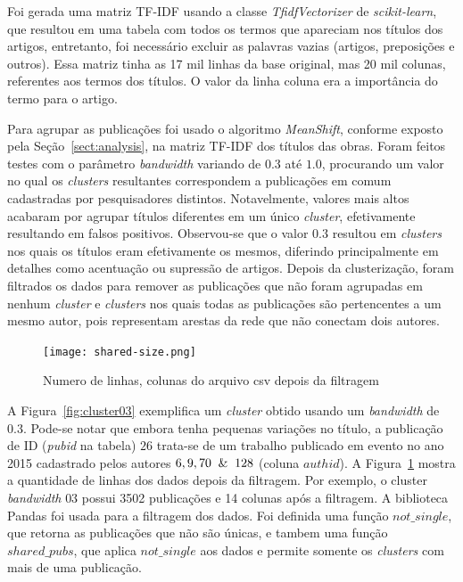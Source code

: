 \documentclass[12pt]{article}
\begin{document}
Foi gerada uma matriz TF-IDF usando a classe \textit{TfidfVectorizer} de \textit{scikit-learn}, que resultou em uma tabela com todos os termos que apareciam nos títulos dos artigos, entretanto, foi necessário excluir as palavras vazias (artigos, preposições e outros). Essa matriz tinha as 17 mil linhas da base original, mas 20 mil colunas, referentes aos termos dos títulos. O valor da linha coluna era a importância do termo para o artigo.

Para agrupar as publicações foi usado o algoritmo \textit{MeanShift}, conforme exposto pela Seção~\ref{sect:analysis}, na matriz TF-IDF dos títulos das obras. Foram feitos testes com o parâmetro \textit{bandwidth} variando de $0.3$ até $1.0$, procurando um valor no qual os \textit{clusters} resultantes correspondem a publicações em comum cadastradas por pesquisadores distintos. Notavelmente, valores mais altos acabaram por agrupar títulos diferentes em um único \textit{cluster}, efetivamente resultando em falsos positivos. Observou-se que o valor $0.3$ resultou em \textit{clusters} nos quais os títulos eram efetivamente os mesmos, diferindo principalmente em detalhes como acentuação ou supressão de artigos. Depois da clusterização, foram filtrados os dados para remover as publicações que não foram agrupadas em nenhum \textit{cluster} e \textit{clusters} nos quais todas as publicações são pertencentes a um mesmo autor, pois representam arestas da rede que não conectam dois autores.

\begin{figure}[ht]
\centering
  \texttt{[image: shared-size.png]}
  \caption{Numero de linhas, colunas do arquivo csv depois da filtragem}
  \label{fig:numeroCluster}
\end{figure}

A Figura~\ref{fig:cluster03} exemplifica um \textit{cluster} obtido usando um \textit{bandwidth} de $0.3$. Pode-se notar que embora tenha pequenas variações no título, a publicação de ID (\textit{pubid} na tabela) $26$ trata-se de um trabalho publicado em evento no ano 2015 cadastrado pelos autores $6, 9, 70 \And 128$ (coluna $authid$). A Figura~\ref{fig:numeroCluster} mostra a quantidade de linhas dos dados depois da filtragem. Por exemplo, o cluster \textit{bandwidth} $03$ possui 3502 publicações e 14 colunas após a filtragem. A biblioteca Pandas foi usada para a filtragem dos dados. Foi definida uma função $not\_single$, que retorna as publicações que não são únicas, e tambem uma função $shared\_pubs$, que aplica $not\_single$ aos dados e permite somente os \textit{clusters} com mais de uma publicação.
\end{document}

